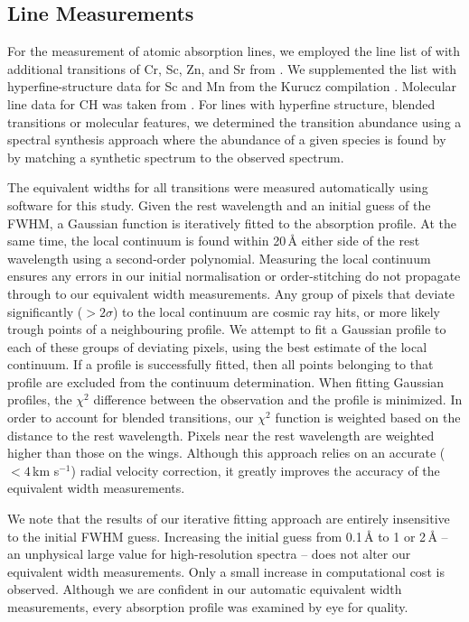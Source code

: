 \documentclass{emulateapj}
\begin{document}
\subsection{Line Measurements}
\label{sec:line-measurements}

For the measurement of atomic absorption lines, we employed the line list of \citet{yong;et-al_2005} with additional transitions of Cr, Sc, Zn, and Sr from \citet{frebel;et-al_2010}. We supplemented the list with hyperfine-structure data for Sc and Mn from the Kurucz compilation \citet{Kurucz;1998}. Molecular line data for CH was taken from \citet{Plez;et-al_2008,Plez;et-al_2009}. For lines with hyperfine structure, blended transitions or molecular features, we determined the transition abundance using a spectral synthesis approach where the abundance of a given species is found by by matching a synthetic spectrum to the observed spectrum.

The equivalent widths for all transitions were measured automatically using software for this study. Given the rest wavelength and an initial guess of the FWHM, a Gaussian function is iteratively fitted to the absorption profile. At the same time, the local continuum is found within 20\,\AA{} either side of the rest wavelength using a second-order polynomial. Measuring the local continuum ensures any errors in our initial normalisation or order-stitching do not propagate through to our equivalent width measurements. Any group of pixels that deviate significantly ($>2\sigma$) to the local continuum are cosmic ray hits, or more likely trough points of a neighbouring profile. We attempt to fit a Gaussian profile to each of these groups of deviating pixels, using the best estimate of the local continuum. If a profile is successfully fitted, then all points belonging to that profile are excluded from the continuum determination. When fitting Gaussian profiles, the $\chi^2$ difference between the observation and the profile is minimized. In order to account for blended transitions, our $\chi^2$ function is weighted based on the distance to the rest wavelength. Pixels near the rest wavelength are weighted higher than those on the wings. Although this approach relies on an accurate ($<4$\,km s$^{-1}$) radial velocity correction, it greatly improves the accuracy of the equivalent width measurements.

We note that the results of our iterative fitting approach are entirely insensitive to the initial FWHM guess. Increasing the initial guess from 0.1\,\AA{} to 1 or 2\,\AA{} -- an unphysical large value for high-resolution spectra -- does not alter our equivalent width measurements. Only a small increase in computational cost is observed. Although we are confident in our automatic equivalent width measurements, every absorption profile was examined by eye for quality. 
\end{document}
